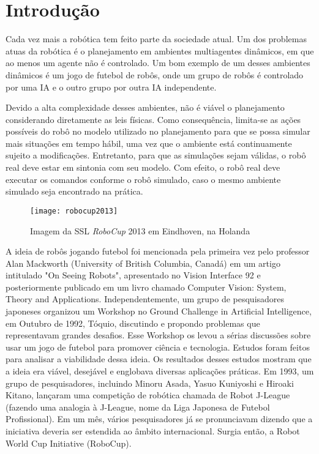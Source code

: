 \chapter{Introdução}

Cada vez mais a robótica tem feito parte da sociedade atual. Um dos problemas
atuas da robótica é o planejamento em ambientes multiagentes dinâmicos, em que
ao menos um agente não é controlado. Um bom exemplo de um desses ambientes
dinâmicos é um jogo de futebol de robôs, onde um grupo de robôs é controlado por
uma IA e o outro grupo por outra IA independente.

Devido a alta complexidade desses ambientes, não é viável o planejamento
considerando diretamente as leis físicas. Como consequência, limita-se as ações
possíveis do robô no modelo utilizado no planejamento para que se possa simular
mais situações em tempo hábil, uma vez que o ambiente está continuamente sujeito
a modificações. Entretanto, para que as simulações sejam válidas, o robô real
deve estar em sintonia com seu modelo. Com efeito, o robô real deve executar os
comandos conforme o robô simulado, caso o mesmo ambiente simulado seja
encontrado na prática.

\begin{figure}
  \centering
  \texttt{[image: robocup2013]}
  \caption{Imagem da SSL \textit{RoboCup} 2013 em Eindhoven, na Holanda}\label{fig:robocup2013}
\end{figure}

A ideia de robôs jogando futebol foi mencionada pela primeira vez pelo professor
Alan Mackworth (University of British Columbia, Canadá) em um artigo intitulado
"On Seeing Robots", apresentado no Vision Interface 92 e posteriormente
publicado em um livro chamado Computer Vision: System, Theory and Applications.
Independentemente, um grupo de pesquisadores japoneses organizou um Workshop no
Ground Challenge in Artificial Intelligence, em Outubro de 1992, Tóquio,
discutindo e propondo problemas que representavam grandes desafios. Esse
Workshop os levou a sérias discussões sobre usar um jogo de futebol para
promover ciência e tecnologia. Estudos foram feitos para analisar a viabilidade
dessa ideia. Os resultados desses estudos mostram que a ideia era viável,
desejável e englobava diversas aplicações práticas. Em 1993, um grupo de
pesquisadores, incluindo Minoru Asada, Yasuo Kuniyoshi e Hiroaki Kitano,
lançaram uma competição de robótica chamada de Robot J-League (fazendo uma
analogia à J-League, nome da Liga Japonesa de Futebol Profissional). Em um mês,
vários pesquisadores já se pronunciavam dizendo que a iniciativa deveria ser
estendida ao âmbito internacional. Surgia então, a Robot World Cup Initiative
(RoboCup).

